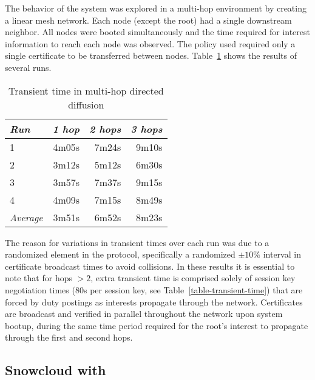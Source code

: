 The behavior of the system was explored in a multi-hop environment by creating a linear mesh
network. Each node (except the root) had a single downstream neighbor. All nodes were booted
simultaneously and the time required for interest information to reach each node was observed.
The policy used required only a single certificate to be transferred between nodes.
Table~\ref{table-multi-hop-transient} shows the results of several runs.

\begin{table}[tbhp]
  \newcommand\T{\rule{0pt}{2.1ex}}
  \centering
  \caption{Transient time in multi-hop directed diffusion}
  {
  \begin{tabular}{|l|r|r|r|} \hline
    \textit{Run} \T & \textit{1 hop }
                    & \textit{2 hops}
                    & \textit{3 hops} \\ \hline \hline

                   1 \T &  4m05s & 7m24s & 9m10s \\ \hline
                   2 \T &  3m12s & 5m12s & 6m30s \\ \hline
                   3 \T &  3m57s & 7m37s & 9m15s \\ \hline
                   4 \T &  4m09s & 7m15s & 8m49s \\ \hline
    \textit{Average} \T &  3m51s & 6m52s & 8m23s \\ \hline
  \end{tabular}
  }
  \label{table-multi-hop-transient}
\end{table}

The reason for variations in transient times over each run was due to a randomized element in
the protocol, specifically a randomized $\pm 10\%$ interval in certificate broadcast times to
avoid collisions. In these results it is essential to note that for hops $> 2$, extra transient
time is comprised solely of session key negotiation times (80s per session key, see
Table~\ref{table-transient-time}) that are forced by duty postings as interests propagate
through the network. Certificates are broadcast and verified in parallel throughout the network
upon system bootup, during the same time period required for the root's interest to propagate
through the first and second hops.

\subsection{Snowcloud with \Sprocket}
\label{section-snowcloud-sprocket}

